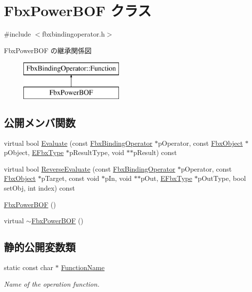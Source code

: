 \hypertarget{class_fbx_power_b_o_f}{}\section{Fbx\+Power\+B\+OF クラス}
\label{class_fbx_power_b_o_f}


{\ttfamily \#include $<$fbxbindingoperator.\+h$>$}

Fbx\+Power\+B\+OF の継承関係図\begin{figure}[H]
\begin{center}
\leavevmode
\includegraphics[height=2.000000cm]{class_fbx_power_b_o_f}
\end{center}
\end{figure}
\subsection*{公開メンバ関数}
\begin{DoxyCompactItemize}
\item 
virtual bool \hyperlink{class_fbx_power_b_o_f_a6e8bfdde2e9ec733432c9ec7a9ef7195}{Evaluate} (const \hyperlink{class_fbx_binding_operator}{Fbx\+Binding\+Operator} $\ast$p\+Operator, const \hyperlink{class_fbx_object}{Fbx\+Object} $\ast$p\+Object, \hyperlink{fbxpropertytypes_8h_a73913a5ddfb20e57c6f25e9e6784bd92}{E\+Fbx\+Type} $\ast$p\+Result\+Type, void $\ast$$\ast$p\+Result) const
\item 
virtual bool \hyperlink{class_fbx_power_b_o_f_a6117db8807508595bbe95de7e547cad3}{Reverse\+Evaluate} (const \hyperlink{class_fbx_binding_operator}{Fbx\+Binding\+Operator} $\ast$p\+Operator, const \hyperlink{class_fbx_object}{Fbx\+Object} $\ast$p\+Target, const void $\ast$p\+In, void $\ast$$\ast$p\+Out, \hyperlink{fbxpropertytypes_8h_a73913a5ddfb20e57c6f25e9e6784bd92}{E\+Fbx\+Type} $\ast$p\+Out\+Type, bool set\+Obj, int index) const
\item 
\hyperlink{class_fbx_power_b_o_f_a7b43e79a346342fd463b3c29291cc469}{Fbx\+Power\+B\+OF} ()
\item 
virtual \hyperlink{class_fbx_power_b_o_f_a1843470d60013a08ea062411a85f9f01}{$\sim$\+Fbx\+Power\+B\+OF} ()
\end{DoxyCompactItemize}
\subsection*{静的公開変数類}
\begin{DoxyCompactItemize}
\item 
static const char $\ast$ \hyperlink{class_fbx_power_b_o_f_a1201076a74abe5321aeafafcd4b65f63}{Function\+Name}
\begin{DoxyCompactList}\small\item\em Name of the operation function. \end{DoxyCompactList}\end{DoxyCompactItemize}


